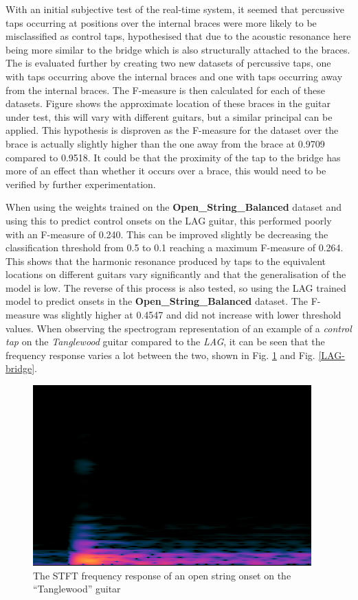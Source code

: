 \documentclass[conference]{IEEEtran}
\begin{document}
With an initial subjective test of the real-time system, it seemed that percussive taps occurring at positions over the internal braces were more likely to be misclassified as control taps, hypothesised that due to the acoustic resonance here being more similar to the bridge which is also structurally attached to
the braces. The is evaluated further by creating two new datasets of percussive taps, one with taps occurring above the internal braces and one with taps occurring away from the internal braces. The F-measure is then calculated for each of these datasets.
Figure shows the approximate location of these braces in the guitar under test, this will vary with different guitars, but a similar principal can be applied. This hypothesis is disproven as the F-measure for the dataset over the brace is actually slightly higher than the 
one away from the brace at 0.9709 compared to 0.9518. It could be that the proximity of the tap to the bridge has more of an effect than whether it occurs over a brace, this would need to be verified by further experimentation. 

When using the weights trained on the \textbf{Open\_String\_Balanced} dataset and using this to predict control onsets on the LAG guitar, this performed poorly with an F-measure of 0.240. This can be improved slightly be decreasing the classification threshold from 0.5 to 0.1 reaching
a maximum F-measure of 0.264. This shows that the harmonic resonance produced by taps to the equivalent locations on different guitars vary significantly and that the generalisation of the model is low. The reverse of this process is also tested, so using the LAG trained model to predict
onsets in the \textbf{Open\_String\_Balanced} dataset. The F-measure was slightly higher at 0.4547 and did not increase with lower threshold values. When observing the spectrogram representation of an example of a \emph{control tap} on the \emph{Tanglewood} guitar compared to the \emph{LAG},
it can be seen that the frequency response varies a lot between the two, shown in Fig. \ref{acoustic-bridge} and Fig. \ref{LAG-bridge}.

\begin{figure}[htbp]
    \centerline{\includegraphics[scale=0.4]{acoustic-bridge.png}}
    \caption{The STFT frequency response of an open string onset on the ``Tanglewood'' guitar}
    \label{acoustic-bridge}
    \end{figure}
\end{document}
